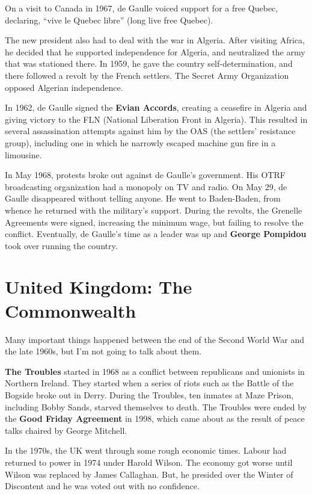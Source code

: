 On a visit to Canada in 1967, de Gaulle voiced support for a free Quebec,
declaring, ``vive le Quebec libre'' (long live free Quebec).

The new president also had to deal with the war in Algeria.
After visiting Africa, he decided that he supported independence for Algeria,
and neutralized the army that was stationed there.
In 1959, he gave the country self-determination, and there followed a revolt by the French settlers.
The Secret Army Organization opposed Algerian independence.

In 1962, de Gaulle signed the \textbf{Evian Accords},
creating a ceasefire in Algeria and giving victory to the FLN (National Liberation Front in Algeria).
This resulted in several assassination attempts against him by the OAS (the settlers' resistance group),
including one in which he narrowly escaped machine gun fire in a limousine.

In May 1968, protests broke out against de Gaulle's government.
His OTRF broadcasting organization had a monopoly on TV and radio.
On May 29, de Gaulle disappeared without telling anyone.
He went to Baden-Baden, from whence he returned with the military's support.
During the revolts, the Grenelle Agreements were signed, increasing the minimum wage,
but failing to resolve the conflict.
Eventually, de Gaulle's time as a leader was up and \textbf{George Pompidou} took over running the country.

\section{United Kingdom: The Commonwealth}

Many important things happened between the end of the Second World War and the late 1960s,
but I'm not going to talk about them.

\textbf{The Troubles} started in 1968 as a conflict between republicans and unionists in Northern Ireland.
They started when a series of riots such as the Battle of the Bogside broke out in Derry.
During the Troubles, ten inmates at Maze Prison, including Bobby Sands,
starved themselves to death.
The Troubles were ended by the \textbf{Good Friday Agreement} in 1998,
which came about as the result of peace talks chaired by George Mitchell.

In the 1970s, the UK went through some rough economic times.
Labour had returned to power in 1974 under Harold Wilson.
The economy got worse until Wilson was replaced by James Callaghan.
But, he presided over the Winter of Discontent and he was voted out with no confidence.

